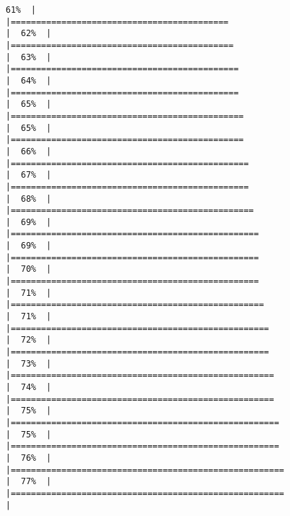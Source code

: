 \documentclass[
]{article}
\begin{document}
\begin{verbatim}
61%  |                                                                              |===========================================                           |  62%  |                                                                              |============================================                          |  63%  |                                                                              |=============================================                         |  64%  |                                                                              |=============================================                         |  65%  |                                                                              |==============================================                        |  65%  |                                                                              |==============================================                        |  66%  |                                                                              |===============================================                       |  67%  |                                                                              |===============================================                       |  68%  |                                                                              |================================================                      |  69%  |                                                                              |=================================================                     |  69%  |                                                                              |=================================================                     |  70%  |                                                                              |=================================================                     |  71%  |                                                                              |==================================================                    |  71%  |                                                                              |===================================================                   |  72%  |                                                                              |===================================================                   |  73%  |                                                                              |====================================================                  |  74%  |                                                                              |====================================================                  |  75%  |                                                                              |=====================================================                 |  75%  |                                                                              |=====================================================                 |  76%  |                                                                              |======================================================                |  77%  |                                                                              |======================================================                |  
\end{verbatim}
\end{document}
